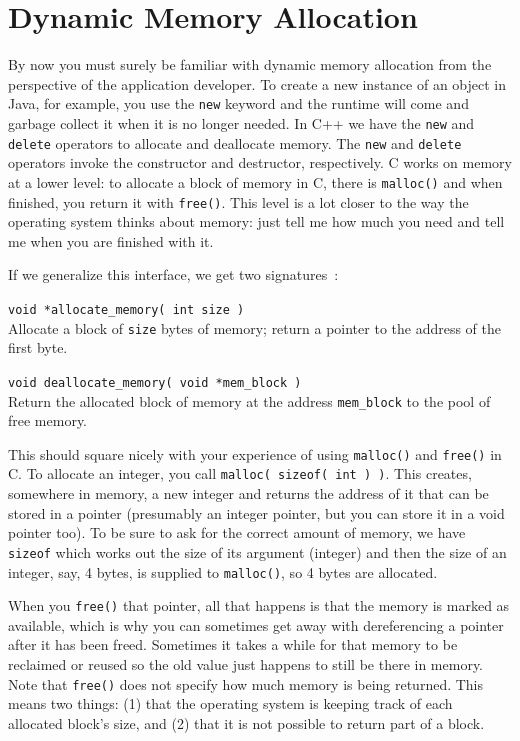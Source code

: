 




\section*{Dynamic Memory Allocation}
By now you must surely be familiar with dynamic memory allocation from the perspective of the application developer. To create a new instance of an object in Java, for example, you use the \texttt{new} keyword and the runtime will come and garbage collect it when it is no longer needed. In C++ we have the \texttt{new} and \texttt{delete} operators to allocate and deallocate memory. The \texttt{new} and \texttt{delete} operators invoke the constructor and destructor, respectively. C works on memory at a lower level: to allocate a block of memory in C, there is \texttt{malloc()} and when finished, you return it with \texttt{free()}. This level is a lot closer to the way the operating system thinks about memory: just tell me how much you need and tell me when you are finished with it.

If we generalize this interface, we get two signatures~\cite{mte241}:

\texttt{void *allocate\_memory( int size )}\\
Allocate a block of \texttt{size} bytes of memory; return a pointer to the address of the first byte.

\texttt{void deallocate\_memory( void *mem\_block )}\\
Return the allocated block of memory at the address \texttt{mem\_block} to the pool of free memory.

This should square nicely with your experience of using \texttt{malloc()} and \texttt{free()} in C. To allocate an integer, you call \texttt{malloc( sizeof( int ) )}. This creates, somewhere in memory, a new integer and returns the address of it that can be stored in a pointer (presumably an integer pointer, but you can store it in a void pointer too). To be sure to ask for the correct amount of memory, we have \texttt{sizeof} which works out the size of its argument (integer) and then the size of an integer, say, 4 bytes, is supplied to \texttt{malloc()}, so 4 bytes are allocated. 

When you \texttt{free()} that pointer, all that happens is that the memory is marked as available, which is why you can sometimes get away with dereferencing a pointer after it has been freed. Sometimes it takes a while for that memory to be reclaimed or reused so the old value just happens to still be there in memory. Note that \texttt{free()} does not specify how much memory is being returned. This means two things: (1) that the operating system is keeping track of each allocated block's size, and (2) that it is not possible to return part of a block.

